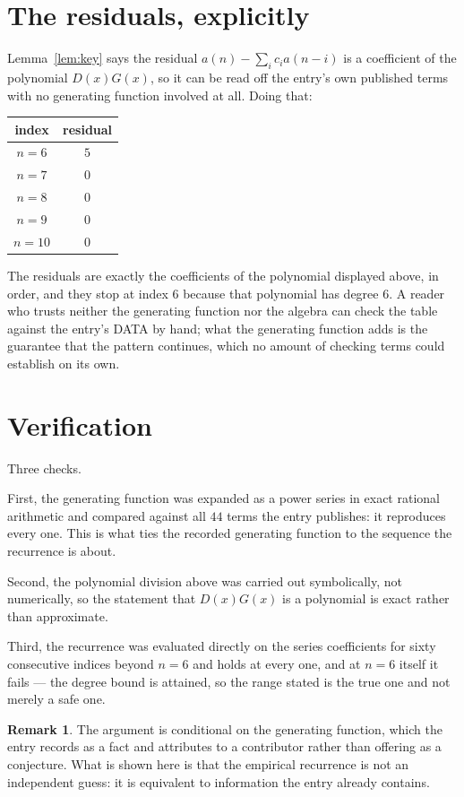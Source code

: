 \documentclass[11pt,a4paper]{article}
\theoremstyle{plain}
\theoremstyle{definition}
\newtheorem{remark}[theorem]{Remark}
\begin{document}
\section{The residuals, explicitly}

Lemma~\ref{lem:key} says the residual $a(n)-\sum_ic_ia(n-i)$ is a coefficient of the
polynomial $D(x)G(x)$, so it can be read off the entry's own published terms with no
generating function involved at all. Doing that:
\begin{center}
\begin{tabular}{cc}
index & residual \\ \hline
$n=6$ & $5$ \\
$n=7$ & $0$ \\
$n=8$ & $0$ \\
$n=9$ & $0$ \\
$n=10$ & $0$
\end{tabular}
\end{center}
The residuals are exactly the coefficients of the polynomial displayed above, in order, and
they stop at index $6$ because that polynomial has degree $6$. A reader who trusts
neither the generating function nor the algebra can check the table against the entry's DATA
by hand; what the generating function adds is the guarantee that the pattern continues, which
no amount of checking terms could establish on its own.

\section{Verification}

Three checks.

First, the generating function was expanded as a power series in exact rational arithmetic and
compared against all $44$ terms the entry publishes: it reproduces every one. This is
what ties the recorded generating function to the sequence the recurrence is about.

Second, the polynomial division above was carried out symbolically, not numerically, so the
statement that $D(x)G(x)$ is a polynomial is exact rather than approximate.

Third, the recurrence was evaluated directly on the series coefficients for sixty consecutive
indices beyond $n=6$ and holds at every one, and at $n=6$ itself it fails --- the
degree bound is attained, so the range stated is the true one and not merely a safe one.

\begin{remark}
The argument is conditional on the generating function, which the entry records as a fact and
attributes to a contributor rather than offering as a conjecture. What is shown here is that
the empirical recurrence is not an independent guess: it is equivalent to information the
entry already contains.
\end{remark}
\end{document}
